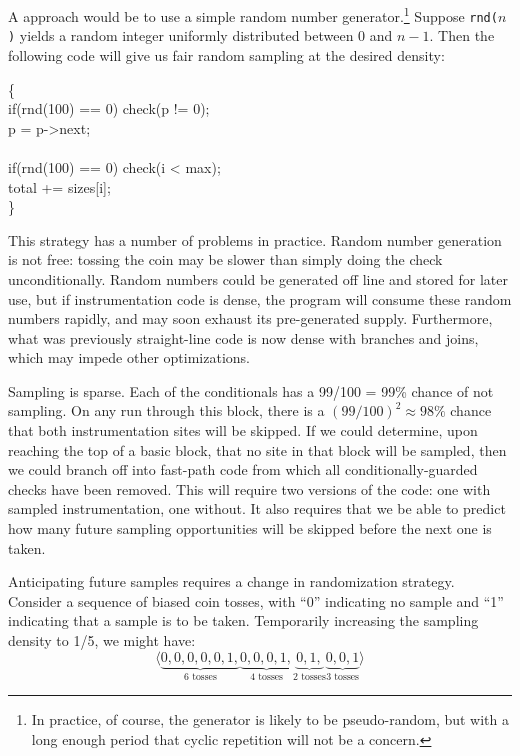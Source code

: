 A \naive approach would be to use a simple random number
generator.\footnote{In practice, of course, the generator is likely to
  be pseudo-random, but with a long enough period that cyclic
  repetition will not be a concern.}  Suppose \texttt{rnd($n$)} yields
a random integer uniformly distributed between 0 and $n-1$.  Then the
following code will give us fair random sampling at the desired
density:

\begin{code}
  \{\+ \\
  if(rnd(100) == 0) check(p != 0); \\
  \up p = p->next; \\
  \\
  if(rnd(100) == 0) check(i < max); \\
  \up total += sizes[i]; \\
  \<\}
\end{code}

This strategy has a number of problems in practice.  Random number
generation is not free: tossing the coin may be slower than simply
doing the check unconditionally.  Random numbers could be generated
off line and stored for later use, but if instrumentation code is
dense, the program will consume these random numbers rapidly, and may
soon exhaust its pre-generated supply.  Furthermore, what was
previously straight-line code is now dense with branches and joins,
which may impede other optimizations.

Sampling is sparse.  Each of the conditionals has a 99/100 = 99\%
chance of not sampling.  On any run through this block, there is a
$(99/100)^2 \approx 98\%$ chance that both instrumentation sites will
be skipped.  If we could determine, upon reaching the top of a basic
block, that no site in that block will be sampled, then we could
branch off into fast-path code from which all conditionally-guarded
checks have been removed.  This will require two versions of the code:
one with sampled instrumentation, one without.  It also requires that
we be able to predict how many future sampling opportunities will be
skipped before the next one is taken.

Anticipating future samples requires a change in randomization
strategy.  Consider a sequence of biased coin tosses, with ``0''
indicating no sample and ``1'' indicating that a sample is to be
taken.  Temporarily increasing the sampling density to 1/5, we might
have:
\begin{equation*}
  \langle
    \underbrace{0, 0, 0, 0, 0, 1,}_{\text{6 tosses}}
    \underbrace{0, 0, 0, 1,}_{\text{4 tosses}}
    \underbrace{0, 1,}_{\text{2 tosses}}
    \underbrace{0, 0, 1}_{\text{3 tosses}}
    \rangle
\end{equation*}

